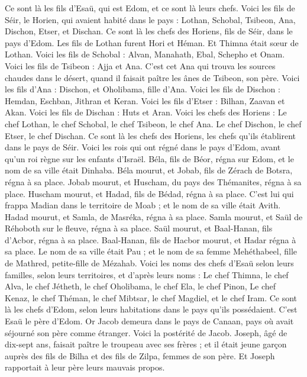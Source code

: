\begin{multicols}{2}
Ce sont là les fils d'Esaü, qui est Edom, et ce sont là leurs chefs.
Voici les fils de Séir, le Horien, qui avaient habité dans le pays : Lothan, Schobal, Tsibeon, Ana,
Dischon, Etser, et Dischan. Ce sont là les chefs des Horiens, fils de Séir, dans le pays d'Edom.
Les fils de Lothan furent Hori et Héman. Et Thimna était sœur de Lothan.
Voici les fils de Schobal : Alvan, Manahath, Ebal, Schepho et Onam.
Voici les fils de Tsibeon : Ajja et Ana. C'est cet Ana qui trouva les sources chaudes dans le désert, quand il faisait paître les ânes de Tsibeon, son père.
Voici les fils d'Ana : Dischon, et Oholibama, fille d'Ana.
Voici les fils de Dischon : Hemdan, Eschban, Jithran et Keran.
Voici les fils d'Etser : Bilhan, Zaavan et Akan.
Voici les fils de Dischan : Huts et Aran.
Voici les chefs des Horiens : Le chef Lothan, le chef Schobal, le chef Tsibeon, le chef Ana.
Le chef Dischon, le chef Etser, le chef Dischan. Ce sont là les chefs des Horiens, les chefs qu'ils établirent dans le pays de Séir.
Voici les rois qui ont régné dans le pays d'Edom, avant qu'un roi règne sur les enfants d'Israël.
Béla, fils de Béor, régna sur Edom, et le nom de sa ville était Dinhaba.
Béla mourut, et Jobab, fils de Zérach de Botsra, régna à sa place.
Jobab mourut, et Huscham, du pays des Thémanites, régna à sa place.
Huscham mourut, et Hadad, fils de Bédad, régna à sa place. C'est lui qui frappa Madian dans le territoire de Moab ; et le nom de sa ville était Avith.
Hadad mourut, et Samla, de Masréka, régna à sa place.
Samla mourut, et Saül de Réhoboth sur le fleuve, régna à sa place.
Saül mourut, et Baal-Hanan, fils d'Acbor, régna à sa place.
Baal-Hanan, fils de Hacbor mourut, et Hadar régna à sa place. Le nom de sa ville était Pau ; et le nom de sa femme Mehéthabeel, fille de Mathred, petite-fille de Mézahab.
Voici les noms des chefs d'Esaü selon leurs familles, selon leurs territoires, et d'après leurs noms : Le chef Thimna, le chef Alva, le chef Jétheth,
le chef Oholibama, le chef Ela, le chef Pinon,
Le chef Kenaz, le chef Théman, le chef Mibtsar,
le chef Magdiel, et le chef Iram. Ce sont là les chefs d'Edom, selon leurs habitations dans le pays qu'ils possédaient. C'est Esaü le père d'Edom.
\VerseOne{}Or Jacob demeura dans le pays de Canaan, pays où avait séjourné son père comme étranger.
Voici la postérité de Jacob. Joseph, âgé de dix-sept ans, faisait paître le troupeau avec ses frères ; et il était jeune garçon auprès des fils de Bilha et des fils de Zilpa, femmes de son père. Et Joseph rapportait à leur père leurs mauvais propos.

\end{multicols}
